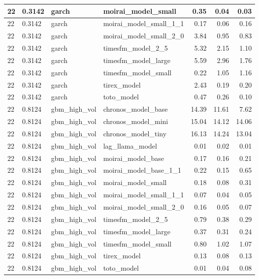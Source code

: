 {\begin{tabular}{llllrrr}
\midrule
22 & 0.3142 & garch & moirai\_model\_small & 0.35 & 0.04 & 0.03 \\
\midrule
22 & 0.3142 & garch & moirai\_model\_small\_1\_1 & 0.17 & 0.06 & 0.16 \\
\midrule
22 & 0.3142 & garch & moirai\_model\_small\_2\_0 & 3.84 & 0.95 & 0.83 \\
\midrule
22 & 0.3142 & garch & timesfm\_model\_2\_5 & 5.32 & 2.15 & 1.10 \\
\midrule
22 & 0.3142 & garch & timesfm\_model\_large & 5.59 & 2.96 & 1.76 \\
\midrule
22 & 0.3142 & garch & timesfm\_model\_small & 0.22 & 1.05 & 1.16 \\
\midrule
22 & 0.3142 & garch & tirex\_model & 2.43 & 0.19 & 0.20 \\
\midrule
22 & 0.3142 & garch & toto\_model & 0.47 & 0.26 & 0.10 \\
\midrule
22 & 0.8124 & gbm\_high\_vol & chronos\_model\_base & 14.39 & 11.61 & 7.62 \\
\midrule
22 & 0.8124 & gbm\_high\_vol & chronos\_model\_mini & 15.04 & 14.12 & 14.06 \\
\midrule
22 & 0.8124 & gbm\_high\_vol & chronos\_model\_tiny & 16.13 & 14.24 & 13.04 \\
\midrule
22 & 0.8124 & gbm\_high\_vol & lag\_llama\_model & 0.01 & 0.02 & 0.01 \\
\midrule
22 & 0.8124 & gbm\_high\_vol & moirai\_model\_base & 0.17 & 0.16 & 0.21 \\
\midrule
22 & 0.8124 & gbm\_high\_vol & moirai\_model\_base\_1\_1 & 0.22 & 0.15 & 0.65 \\
\midrule
22 & 0.8124 & gbm\_high\_vol & moirai\_model\_small & 0.18 & 0.08 & 0.31 \\
\midrule
22 & 0.8124 & gbm\_high\_vol & moirai\_model\_small\_1\_1 & 0.07 & 0.04 & 0.05 \\
\midrule
22 & 0.8124 & gbm\_high\_vol & moirai\_model\_small\_2\_0 & 0.16 & 0.05 & 0.07 \\
\midrule
22 & 0.8124 & gbm\_high\_vol & timesfm\_model\_2\_5 & 0.79 & 0.38 & 0.29 \\
\midrule
22 & 0.8124 & gbm\_high\_vol & timesfm\_model\_large & 0.37 & 0.31 & 0.24 \\
\midrule
22 & 0.8124 & gbm\_high\_vol & timesfm\_model\_small & 0.80 & 1.02 & 1.07 \\
\midrule
22 & 0.8124 & gbm\_high\_vol & tirex\_model & 0.13 & 0.08 & 0.13 \\
\midrule
22 & 0.8124 & gbm\_high\_vol & toto\_model & 0.01 & 0.04 & 0.08 \\
\bottomrule
\end{tabular}
}